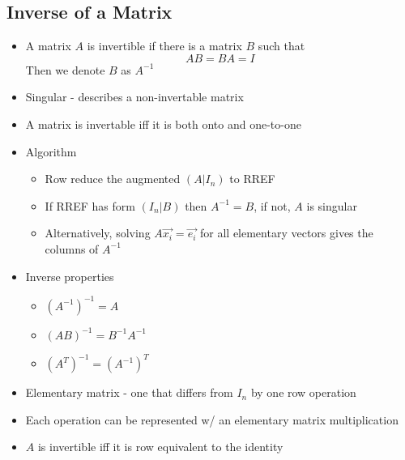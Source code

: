 \documentclass{article}
\begin{document}
\subsection{Inverse of a Matrix}
\begin{itemize}
    \item A matrix \(A\) is invertible if there is a matrix \(B\) such that \[AB=BA=I\] Then we denote \(B\) as \(A^{-1}\)
    \item Singular - describes a non-invertable matrix
    \item A matrix is invertable iff it is both onto and one-to-one 
    \item Algorithm
    \begin{itemize}
        \item Row reduce the augmented \((A|I_n)\) to RREF 
        \item If RREF has form \((I_n|B)\) then \(A^{-1}=B\), if not, \(A\) is singular 
        \item Alternatively, solving \(A\vec{x_i}=\vec{e_i}\) for all elementary vectors gives the columns of \(A^{-1}\)
    \end{itemize}
    \item Inverse properties
    \begin{itemize}
        \item \((A^{-1})^{-1}=A\)
        \item \((AB)^{-1}=B^{-1}A^{-1}\)
        \item \((A^T)^{-1}=(A^{-1})^T\)
    \end{itemize}
    \item Elementary matrix - one that differs from \(I_n\) by one row operation 
    \item Each operation can be represented w/ an elementary matrix multiplication 
    \item \(A\) is invertible iff it is row equivalent to the identity 
\end{itemize}
\end{document}
